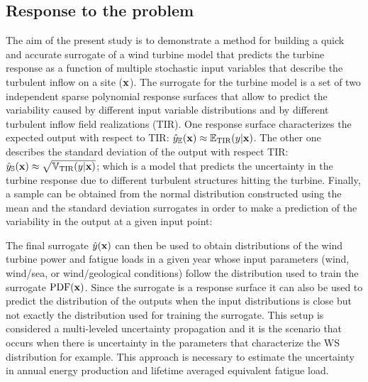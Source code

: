 \documentclass[preprint,12pt]{elsarticle}
\begin{document}
\subsection{Response to the problem}
The aim of the present study is to demonstrate a method for building a quick and accurate surrogate of a wind turbine model that predicts the turbine response as a function of multiple stochastic input variables that describe the turbulent inflow on a site ($\mathbf{x}$). The surrogate for the turbine model is a set of two independent sparse polynomial response surfaces that allow to predict the variability caused by different input variable distributions and by different turbulent inflow field realizations (TIR). %
One response surface characterizes the expected output with respect to TIR: $\hat{y}_{\mathbb{E}}(\mathbf{x})\approx \mathbb{E}_{\text{TIR}}(y|\mathbf{x})$. The other one describes the standard deviation of the output with respect TIR: $\hat{y}_{\mathbb{S}}(\mathbf{x}) \approx \sqrt{\mathbb{V}_{\text{TIR}}(y|\mathbf{x})}$; which is a model that predicts the uncertainty in the turbine response due to different turbulent structures hitting the turbine. Finally, a sample can be obtained from the normal distribution constructed using the mean and the standard deviation surrogates in order to make a prediction of the variability in the output at a given input point:



The final surrogate $\hat{y}(\mathbf{x})$ can then be used to obtain distributions of the wind turbine power and fatigue loads in a given year whose input parameters (wind, wind/sea, or wind/geological conditions) follow the distribution used to train the surrogate $\mathrm{PDF}(\mathbf{x})$. Since the surrogate is a response surface it can also be used to predict the distribution of the outputs when the input distributions is close but not exactly the distribution used for training the surrogate. This setup is considered a multi-leveled uncertainty propagation and it is the scenario that occurs when there is uncertainty in the parameters that characterize the WS distribution for example. This approach is necessary to estimate the uncertainty in annual energy production and lifetime averaged equivalent fatigue load.
\end{document}
